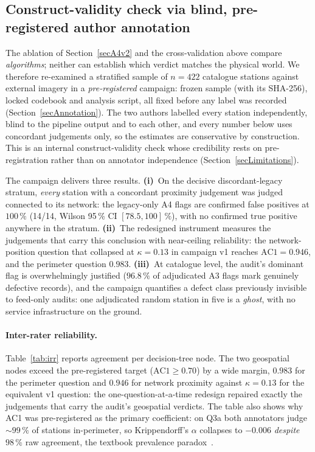 \documentclass[11pt,a4paper]{article}
\begin{document}
\subsection{Construct-validity check via blind, pre-registered author annotation}\label{secHumanVal}
The ablation of Section~\ref{secA4v2} and the cross-validation above
compare \emph{algorithms}; neither can establish which verdict matches the
physical world. We therefore re-examined a stratified sample of $n = 422$
catalogue stations against external imagery in a \emph{pre-registered}
campaign: frozen sample (with its SHA-256), locked codebook and analysis
script, all fixed before any label was recorded
(Section~\ref{secAnnotation}). The two authors labelled every station
independently, blind to the pipeline output and to each other, and every
number below uses concordant judgements only, so the estimates are
conservative by construction. This is an internal construct-validity check
whose credibility rests on pre-registration rather than on annotator
independence (Section~\ref{secLimitations}).

The campaign delivers three results. \textbf{(i)}~On the decisive
discordant-legacy stratum, \emph{every} station with a concordant
proximity judgement was judged connected to its network: the legacy-only
A4 flags are confirmed false positives at $100\,\%$ (14/14, Wilson 95\,\%
CI $[78.5, 100]\,\%$), with no confirmed true positive anywhere in the
stratum. \textbf{(ii)}~The redesigned instrument measures the judgements
that carry this conclusion with near-ceiling reliability: the
network-position question that collapsed at $\kappa = 0.13$ in campaign
v1 reaches $\mathrm{AC1} = 0.946$, and the perimeter question $0.983$.
\textbf{(iii)}~At catalogue level, the audit's dominant flag is
overwhelmingly justified ($96.8\,\%$ of adjudicated A3 flags mark
genuinely defective records), and the campaign quantifies a defect class
previously invisible to feed-only audits: one adjudicated random station
in five is a \emph{ghost}, with no service infrastructure on the ground.

\paragraph{Inter-rater reliability.}
Table~\ref{tab:irr} reports agreement per decision-tree node. The two
geospatial nodes exceed the pre-registered target
($\mathrm{AC1} \ge 0.70$) by a wide margin, $0.983$ for the perimeter
question and $0.946$ for network proximity against $\kappa = 0.13$ for
the equivalent v1 question: the one-question-at-a-time redesign repaired
exactly the judgements that carry the audit's geospatial verdicts. The
table also shows why AC1 was pre-registered as the primary coefficient:
on Q3a both annotators judge $\sim$$99\,\%$ of stations in-perimeter, so
Krippendorff's $\alpha$ collapses to $-0.006$ \emph{despite} $98\,\%$ raw
agreement, the textbook prevalence paradox~\cite{Gwet2008AC1}.
\end{document}

